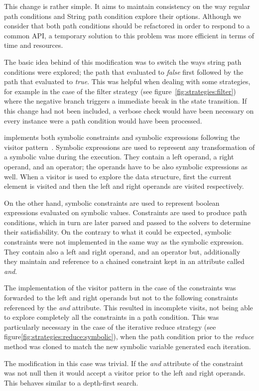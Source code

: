 
This change is rather simple. It aims to maintain consistency on the way regular path conditions and String path condition explore their options. Although we consider that both path conditions should be refactored in order to respond to a common API, a temporary solution to this problem was more efficient in terms of time and resources.

The basic idea behind of this modification was to switch the ways string path conditions were explored; the path that evaluated to \textit{false} first followed by the path that evaluated to \textit{true}. This was helpful when dealing with some strategies, for example in the case of the filter strategy (see figure~\ref{fig:strategies:filter}) where the negative branch triggers a immediate break in the state transition. If this change had not been included, a verbose check would have been necessary on every instance were a path condition would have been processed.


\spf{} implements both symbolic constraints and symbolic expressions following the visitor pattern~\cite{Gamma1994}. Symbolic expressions are used to represent any transformation of a symbolic value during the execution. They contain a left operand, a right operand, and an operator; the operands have to be also symbolic expressions as well. When a visitor is used to explore the data structure, first the current element is visited and then the left and right operands are visited respectively. 

On the other hand, symbolic constraints are used to represent boolean expressions evaluated on symbolic values. Constraints are used to produce path conditions, which in turn are later parsed and passed to the solvers to determine their satisfiability. On the contrary to what it could be expected, symbolic constraints were not implemented in the same way as the symbolic expression. They contain also a left and right operand, and an operator but, additionally they maintain and reference to a chained constraint kept in an attribute called \textit{and}.

The implementation of the visitor pattern in the case of the constraints was forwarded to the left and right operands but not to the following constraints referenced by the \textit{and} attribute. This resulted in incomplete visits, not being able to explore completely all the constraints in a path condition. This was particularly necessary in the case of the iterative reduce strategy (see figure\ref{fig:strategies:reduce:symbolic}), when the path condition prior to the \textit{reduce} method was cloned to match the new symbolic variable generated each iteration.

The modification in this case was trivial. If the \textit{and} attribute of the constraint was not null then it would accept a visitor prior to the left and right operands. This behaves similar to a depth-first search.